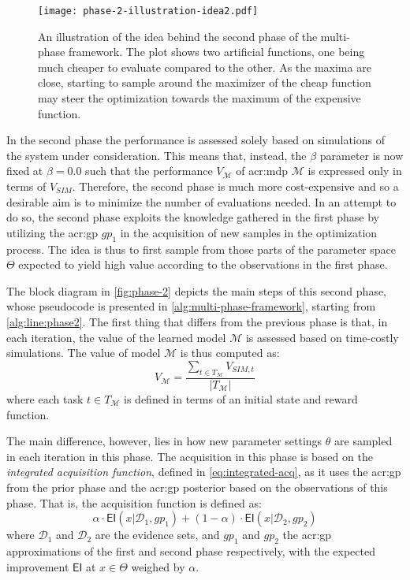 \begin{figure}[t!]
	\centering
	\texttt{[image: phase-2-illustration-idea2.pdf]}
	\caption{An illustration of the idea behind the second phase of the multi-phase framework. The plot shows two artificial functions, one being much cheaper to evaluate compared to the other. As the maxima are close, starting to sample around the maximizer of the cheap function may steer the optimization towards the maximum of the expensive function.}
	\label{fig:phase-2-idea}
\end{figure}

In the second phase the performance is assessed solely based on simulations of the system under consideration.
This means that, instead, the $\beta$ parameter is now fixed at $\beta = 0.0$ such that the performance $V_\mathcal{M}$ of \acrshort{acr:mdp} $\mathcal{M}$ is expressed only in terms of $V_\mathit{SIM}$.
Therefore, the second phase is much more cost-expensive and so a desirable aim is to minimize the number of evaluations needed.
In an attempt to do so, the second phase exploits the knowledge gathered in the first phase by utilizing the \acrshort{acr:gp} $\mathit{gp}_1$ in the acquisition of new samples in the optimization process.
The idea is thus to first sample from those parts of the parameter space $\Theta$ expected to yield high value according to the observations in the first phase.

The block diagram in \autoref{fig:phase-2} depicts the main steps of this second phase, whose pseudocode is presented in \autoref{alg:multi-phase-framework}, starting from \autoref{alg:line:phase2}.
The first thing that differs from the previous phase is that, in each iteration, the value of the learned model $\mathcal{M}$ is assessed based on time-costly simulations.
The value of model $\mathcal{M}$ is thus computed as:
\begin{equation*}
V_\mathcal{M} = \frac{\sum_{t \in T_\mathcal{M}} V_{\mathit{SIM}, t}}{|T_\mathcal{M}|}
\end{equation*}
\noindent where each task $t \in T_\mathcal{M}$ is defined in terms of an initial state and reward function.

The main difference, however, lies in how new parameter settings $\theta$ are sampled in each iteration in this phase.
The acquisition in this phase is based on the \textit{integrated acquisition function}, defined in \autoref{eq:integrated-acq}, as it uses the \acrshort{acr:gp} from the prior phase and the \acrshort{acr:gp} posterior based on the observations of this phase.
That is, the acquisition function is defined as:
$$\alpha\cdot\mathsf{EI}(x\vert\mathcal{D}_1, \mathit{gp}_1) + (1 - \alpha)\cdot\mathsf{EI}(x\vert\mathcal{D}_2, \mathit{gp}_2)$$
\noindent where $\mathcal{D}_1$ and $\mathcal{D}_2$ are the evidence sets, and $\mathit{gp}_1$ and $\mathit{gp}_2$ the \acrshort{acr:gp} approximations of the first and second phase respectively, with the expected improvement $\mathsf{EI}$ at $x \in \Theta$ weighed by $\alpha$.

